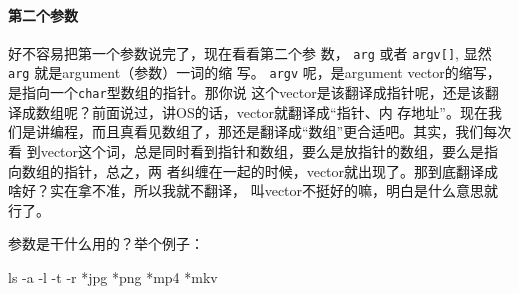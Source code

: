 \documentclass{wx672ctexart}
\begin{document}
\paragraph{第二个参数}
\label{sec:orgf5a515c}

好不容易把第一个参数说完了，现在看看第二个参
数， \texttt{arg} 或者 \texttt{argv[]}, 显然 \texttt{arg} 就是argument（参数）一词的缩
写。 \texttt{argv} 呢，是argument vector的缩写，是指向一个\texttt{char}型数组的指针。那你说
这个vector是该翻译成指针呢，还是该翻译成数组呢？前面说过，讲OS的话，vector就翻译成“指针、内
存地址”。现在我们是讲编程，而且真看见数组了，那还是翻译成“数组”更合适吧。其实，我们每次看
到vector这个词，总是同时看到指针和数组，要么是放指针的数组，要么是指向数组的指针，总之，两
者纠缠在一起的时候，vector就出现了。那到底翻译成啥好？实在拿不准，所以我就不翻译，
叫vector不挺好的嘛，明白是什么意思就行了。

参数是干什么用的？举个例子：

\begin{shellcode}
ls -a -l -t -r *jpg *png *mp4 *mkv
\end{shellcode}
\end{document}

